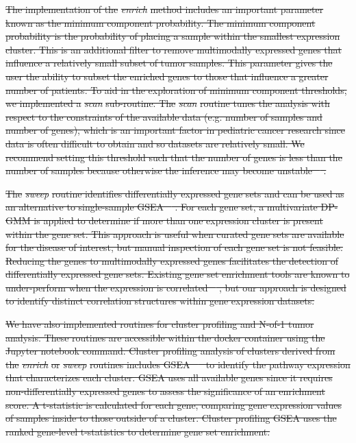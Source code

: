\documentclass[10pt,letterpaper]{article}
\providecommand{\DIFdeltex}[1]{{\protect\color{red}\sout{#1}}}                      %
\providecommand{\DIFdel}[1]{\texorpdfstring{\DIFdeltex{#1}}{}} %
\begin{document}
\DIFdel{The implementation of the }\textit{\DIFdel{enrich}} %
\DIFdel{method includes an important parameter known as the minimum component probability. The minimum component probability is the probability of placing a sample within the smallest expression cluster. This is an additional filter to remove multimodally expressed genes that influence a relatively small subset of tumor samples. This parameter gives the user the ability to subset the enriched genes to those that influence a greater number of patients. To aid in the exploration of minimum component thresholds, we implemented a }\textit{\DIFdel{scan}} %
\DIFdel{sub-routine. The }\textit{\DIFdel{scan}} %
\DIFdel{routine tunes the analysis with respect to the constraints of the available data (e.g. number of samples and number of genes), which is an important factor in pediatric cancer research since data is often difficult to obtain and so datasets are relatively small. We recommend setting this threshold such that the number of genes is less than the number of samples because otherwise the inference may become unstable \mbox{%
\cite{caiConstrainedL1Minimization2011}}\hspace{0pt}%
.
}%

\DIFdel{The }\textit{\DIFdel{sweep}} %
\DIFdel{routine identifies differentially expressed gene sets and can be used as an alternative to single-sample GSEA \mbox{%
\cite{subramanianGeneSetEnrichment2005}}\hspace{0pt}%
. For each gene set, a multivariate DP-GMM is applied to determine if more than one expression cluster is present within the gene set. This approach is useful when curated gene sets are available for the disease of interest, but manual inspection of each gene set is not feasible. Reducing the genes to multimodally expressed genes facilitates the detection of differentially expressed gene sets. Existing gene set enrichment tools are known to under-perform when the expression is correlated \mbox{%
\cite{tamayoLimitationsSimpleGene2016}}\hspace{0pt}%
, but our approach is designed to identify distinct correlation structures within gene expression datasets.
}%

\DIFdel{We have also implemented routines for cluster profiling and N-of-1 tumor analysis. These routines are accessible within the docker container using the Jupyter notebook command. Cluster profiling analysis of clusters derived from the }\textit{\DIFdel{enrich}} %
\DIFdel{or }\textit{\DIFdel{sweep}} %
\DIFdel{routines includes GSEA \mbox{%
\cite{korotkevichFastGeneSet2019} }\hspace{0pt}%
to identify the pathway expression that characterizes each cluster. GSEA uses all available genes since it requires non-differentially expressed genes to assess the significance of an enrichment score. A t-statistic is calculated for each gene, comparing gene expression values of samples inside to those outside of a cluster. Cluster profiling GSEA uses the ranked gene-level t-statistics to determine gene set enrichment.
}%
\end{document}
